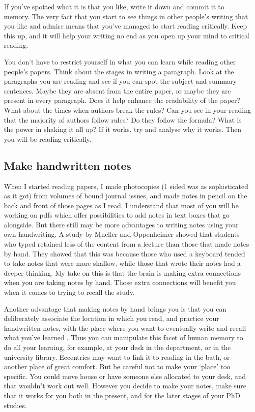 \documentclass[
]{krantz}
\begin{document}
If you've spotted what it is that you like, write it down and commit it to memory. The very fact that you start to see things in other people's writing that you like and admire means that you've managed to start reading critically. Keep this up, and it will help your writing no end as you open up your mind to critical reading.

You don't have to restrict yourself in what you can learn while reading other people's papers. Think about the stages in writing a paragraph. Look at the paragraphs you are reading and see if you can spot the subject and summary sentences. Maybe they are absent from the entire paper, or maybe they are present in every paragraph. Does it help enhance the readability of the paper? What about the times when authors break the rules? Can you see in your reading that the majority of authors follow rules? Do they follow the formula? What is the power in shaking it all up? If it works, try and analyse why it works. Then you will be reading critically.

\hypertarget{make-handwritten-notes}{%
\subsection{Make handwritten notes}\label{make-handwritten-notes}}

When I started reading papers, I made photocopies (1 sided was as sophisticated as it got) from volumes of bound journal issues, and made notes in pencil on the back and front of those pages as I read. I understand that most of you will be working on pdfs which offer possibilities to add notes in text boxes that go alongside. But there still may be more advantages to writing notes using your own handwriting. A study by Mueller and Oppenheimer \citeyearpar{mueller2014pen} showed that students who typed retained less of the content from a lecture than those that made notes by hand. They showed that this was because those who used a keyboard tended to take notes that were more shallow, while those that wrote their notes had a deeper thinking. My take on this is that the brain is making extra connections when you are taking notes by hand. Those extra connections will benefit you when it comes to trying to recall the study.

Another advantage that making notes by hand brings you is that you can deliberately associate the location in which you read, and practice your handwritten notes, with the place where you want to eventually write and recall what you've learned \citep[see][]{bouton1993context}. Thus you can manipulate this facet of human memory to do all your learning, for example, at your desk in the department, or in the university library. Eccentrics may want to link it to reading in the bath, or another place of great comfort. But be careful not to make your `place' too specific. You could move house or have someone else allocated to your desk, and that wouldn't work out well. However you decide to make your notes, make sure that it works for you both in the present, and for the later stages of your PhD studies.
\end{document}
